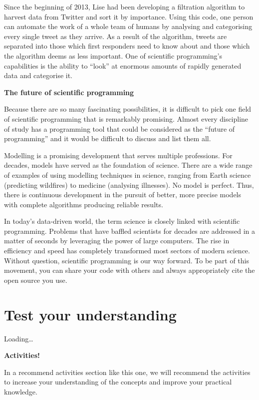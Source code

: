 \documentclass[
]{book}
\begin{document}
Since the beginning of 2013, Lise had been developing a filtration algorithm to harvest data from Twitter and sort it by importance. Using this code, one person can automate the work of a whole team of humans by analysing and categorising every single tweet as they arrive. As a result of the algorithm, tweets are separated into those which first responders need to know about and those which the algorithm deems as less important. One of scientific programming's capabilities is the ability to ``look'' at enormous amounts of rapidly generated data and categorise it.

\textbf{The future of scientific programming}

Because there are so many fascinating possibilities, it is difficult to pick one field of scientific programming that is remarkably promising. Almost every discipline of study has a programming tool that could be considered as the ``future of programming'' and it would be difficult to discuss and list them all.

Modelling is a promising development that serves multiple professions. For decades, models have served as the foundation of science. There are a wide range of examples of using modelling techniques in science, ranging from Earth science (predicting wildfires) to medicine (analysing illnesses). No model is perfect. Thus, there is continuous development in the pursuit of better, more precise models with complete algorithms producing reliable results.

In today's data-driven world, the term science is closely linked with scientific programming. Problems that have baffled scientists for decades are addressed in a matter of seconds by leveraging the power of large computers. The rise in efficiency and speed has completely transformed most sectors of modern science. Without question, scientific programming is our way forward. To be part of this movement, you can share your code with others and always appropriately cite the open source you use.

\hypertarget{test-your-understanding-2}{%
\section{Test your understanding}\label{test-your-understanding-2}}

Loading\ldots{}

\textbf{Activities!}

In a recommend activities section like this one, we will recommend the activities to increase your understanding of the concepts and improve your practical knowledge.
\end{document}
